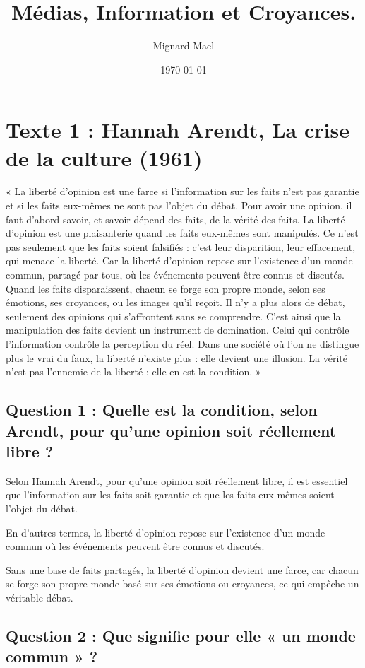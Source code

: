 \documentclass[a4paper,12pt]{article}
\title{Médias, Information et Croyances.}
\author{Mignard Mael}
\date{\today}
\begin{document}
\maketitle

\section{Texte 1 : Hannah Arendt, La crise de la culture (1961)}
\vspace{1cm}
« La liberté d’opinion est une farce si l’information sur les faits n’est pas garantie et si
les faits eux-mêmes ne sont pas l’objet du débat.
Pour avoir une opinion, il faut d’abord savoir, et savoir dépend des faits, de la vérité des
faits.
La liberté d’opinion est une plaisanterie quand les faits eux-mêmes sont manipulés. Ce
n’est pas seulement que les faits soient falsifiés : c’est leur disparition, leur
effacement, qui menace la liberté. Car la liberté d’opinion repose sur l’existence d’un
monde commun, partagé par tous, où les événements peuvent être connus et discutés.
Quand les faits disparaissent, chacun se forge son propre monde, selon ses émotions,
ses croyances, ou les images qu’il reçoit. Il n’y a plus alors de débat, seulement des
opinions qui s’affrontent sans se comprendre.
C’est ainsi que la manipulation des faits devient un instrument de domination. Celui qui
contrôle l’information contrôle la perception du réel.
Dans une société où l’on ne distingue plus le vrai du faux, la liberté n’existe plus : elle
devient une illusion. La vérité n’est pas l’ennemie de la liberté ; elle en est la condition. »

\subsection{Question 1 : Quelle est la condition, selon Arendt, pour qu’une opinion soit réellement libre ?}
Selon Hannah Arendt, pour qu’une opinion soit réellement libre, il est essentiel que l’information sur les faits soit garantie et que les faits eux-mêmes soient l’objet du débat. 

En d'autres termes, la liberté d’opinion repose sur l’existence d’un monde commun où les événements peuvent être connus et discutés. 

Sans une base de faits partagés, la liberté d’opinion devient une farce, car chacun se forge son propre monde basé sur ses émotions ou croyances, ce qui empêche un véritable débat.

\subsection{Question 2 : Que signifie pour elle « un monde commun » ?} 
\end{document}
